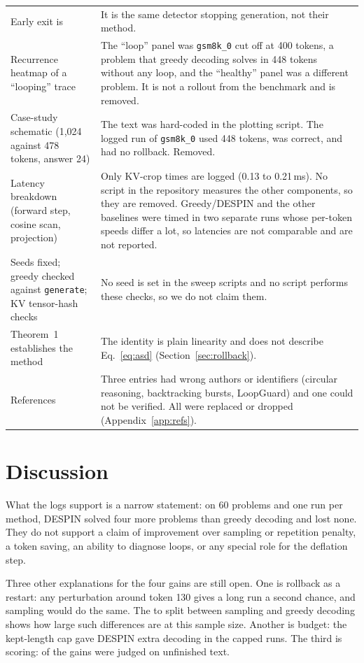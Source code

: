 \documentclass[11pt]{article}
\begin{document}
\begin{table}[t]
\begin{tabularx}{\textwidth}{>{\raggedright\arraybackslash}p{4.3cm}X}
Early exit is \citet{wei2025stop} & It is the same detector stopping generation, not their method. \\
Recurrence heatmap of a ``looping'' trace & The ``loop'' panel was \texttt{gsm8k\_0} cut off at 400 tokens, a problem that greedy decoding solves in 448 tokens without any loop, and the ``healthy'' panel was a different problem. It is not a rollout from the benchmark and is removed. \\
Case-study schematic (1{,}024 against 478 tokens, answer 24) & The text was hard-coded in the plotting script. The logged run of \texttt{gsm8k\_0} used 448 tokens, was correct, and had no rollback. Removed. \\
Latency breakdown (forward step, cosine scan, projection) & Only KV-crop times are logged (0.13 to 0.21\,ms). No script in the repository measures the other components, so they are removed. Greedy/DESPIN and the other baselines were timed in two separate runs whose per-token speeds differ a lot, so latencies are not comparable and are not reported. \\
Seeds fixed; greedy checked against \texttt{generate}; KV tensor-hash checks & No seed is set in the sweep scripts and no script performs these checks, so we do not claim them. \\
Theorem~1 establishes the method & The identity is plain linearity and does not describe Eq.~\eqref{eq:asd} (Section~\ref{sec:rollback}). \\
References & Three entries had wrong authors or identifiers (circular reasoning, backtracking bursts, LoopGuard) and one could not be verified. All were replaced or dropped (Appendix~\ref{app:refs}). \\
\bottomrule
\end{tabularx}
\end{table}

\section{Discussion}

What the logs support is a narrow statement: on 60 problems and one run per method, DESPIN solved four more problems than greedy decoding and lost none. They do not support a claim of improvement over sampling or repetition penalty, a token saving, an ability to diagnose loops, or any special role for the deflation step.

Three other explanations for the four gains are still open. One is rollback as a restart: any perturbation around token 130 gives a long run a second chance, and sampling would do the same. The \statNSamplingVsGreedyOnlyMethod{} to \statNSamplingVsGreedyOnlyGreedy{} split between sampling and greedy decoding shows how large such differences are at this sample size. Another is budget: the kept-length cap gave DESPIN extra decoding in the capped runs. The third is scoring: \statRescueCapped{} of the gains were judged on unfinished text.
\end{document}
